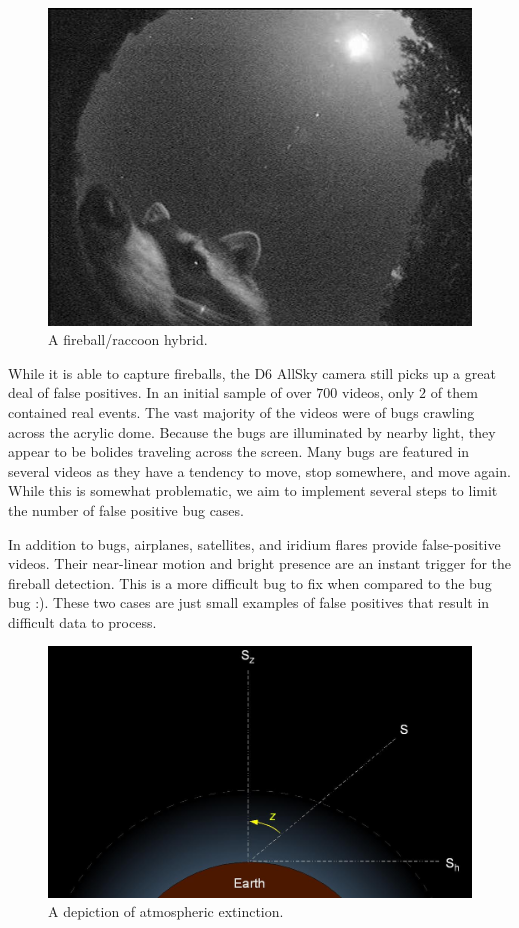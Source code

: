 \begin{figure}[ht!]
  \centering
  \includegraphics[scale=0.3]{images/racoon_cam.jpg}
  \caption{A fireball/raccoon hybrid.}
  \label{raccoon}
\end{figure}

While it is able to capture fireballs, the D6 AllSky camera still picks up a great deal of false positives.
In an initial sample of over $700$ videos, only $2$ of them contained real events.
The vast majority of the videos were of bugs crawling across the acrylic dome.
Because the bugs are illuminated by nearby light, they appear to be bolides traveling across the screen.
Many bugs are featured in several videos as they have a tendency to move, stop somewhere, and move again.
While this is somewhat problematic, we aim to implement several steps to limit the number of false positive bug cases.

In addition to bugs, airplanes, satellites, and iridium flares provide false-positive videos.
Their near-linear motion and bright presence are an instant trigger for the fireball detection.
This is a more difficult bug to fix when compared to the bug bug :).
These two cases are just small examples of false positives that result in difficult data to process.

\begin{figure}[ht!]
  \centering
  \includegraphics[scale=0.4]{images/extinction.JPG}
  \caption{A depiction of atmospheric extinction.}
  \label{extinc}
\end{figure}

